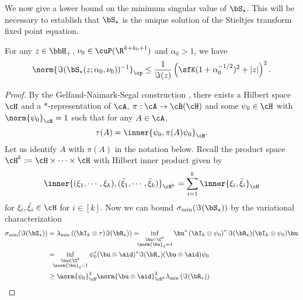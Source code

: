We now give a lower bound on the minimum singular value of $\bS_\star$. This will be necessary to establish that $\bS_\star$ is the unique solution of the Stieltjes transform fixed point equation.
\begin{lemma}
\label{lemma:smallest_singular_value_Sstar}
For any $z\in\bbH_+$, $\nu_0\in\cuP(\R^{k+k_0+1})$ and $\alpha_0 >1$, we have
\begin{equation}
\nonumber
    \norm{\Im(\bS_\star(z; \alpha_0, \nu_0))^{-1}}_\op \le \frac1{\Im(z)} \left(\sfK (1+ \alpha_0^{-1/2})^2 + |z|\right)^2.
\end{equation}
\end{lemma}


\begin{proof}
By the Gelfand-Naimark-Segal construction
\cite[Lecture 7]{nica2006lectures}, there exists a Hilbert space $\cH$ and a $*$-representation of $\cA$, $\pi :\cA \to\cB(\cH)$ and some $\psi_0 \in \cH$ with $\norm{\psi_0}_\cH = 1$ such that for any $A \in\cA$, 
\begin{equation}
    \tau(A) = \inner{\psi_0,\pi(A) \psi_0}_\cH.
\end{equation}
Let us identify $A$ with $\pi(A)$ in the notation below.
Recall the product space $\cH^{k} := \cH \times \cdots \times \cH$ with Hilbert inner product given by
   \begin{equation}
        \inner{
        (\xi_1,\cdots,\xi_k),(\bar\xi_1,\cdots,\bar\xi_k)}_{\cH^k} = \sum_{i=1}^k \inner{\xi_i, \bar \xi_i}_\cH
   \end{equation}
for $\xi_i,\bar \xi_i \in\cH$ for $i\in[k]$.
Now we can bound 
$\sigma_{\min}(\Im(\bS_\star))$ by the variational characterization 
\begin{align}
\sigma_{\min}(\Im(\bS_\star)) 
&= 
   \lambda_{\min}\left((\bI_k \otimes \tau)\Im(\bR_\star)\right)
   =\hspace{-2mm} \inf_{\substack{\bu\in\C^k\\\norm{\bu}_2 = 1}}  \bu^* 
   \left(\bI_k\otimes \psi_0\right)^* \Im(\bR_\star)(\bI_k \otimes \psi_0) \bu
  \nonumber 
   \\
&= \hspace{-2mm}\inf_{\substack{\bu\in\C^k\\\norm{\bu}_2 = 1}} \psi_0^* (\bu\otimes \aid)^* 
    \Im(\bR_\star)(\bu \otimes \aid) \psi_0
    \nonumber
   \\
&\ge  \norm{\psi_0}_\cH^2 \norm{\bu \otimes \aid}_{\cH^k}^2 
\lambda_{\min}\left(\Im(\bR_\star)\right) 

\end{align}
\end{proof}
